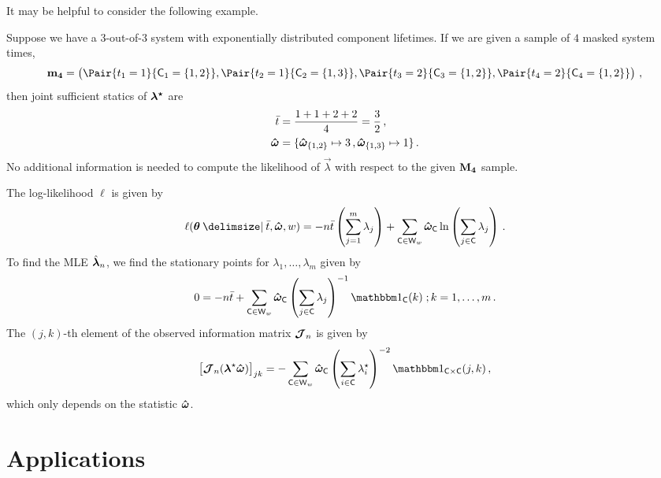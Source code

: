 \documentclass[
    11pt,
    extrafontsizes,
    article,
    oldfontcommands,
    final,
    oneside,
    openany,
    hidelinks]{memoir}
\begin{document}
It may be helpful to consider the following example.
\begin{example}
Suppose we have a $3$-out-of-$3$ system with exponentially distributed component lifetimes.
If we are given a sample of $4$ masked system times,
\begin{equation}
    \mfsoi{4} = \left(
        \Pair{t_1 = 1}{\cand_1 = \{ 1, 2 \}},
        \Pair{t_2 = 1}{\cand_2 = \{ 1, 3 \}},
        \Pair{t_3 = 2}{\cand_3 = \{ 1, 2 \}},
        \Pair{t_4 = 2}{\cand_4 = \{ 1, 2 \}}
    \right)\,,
\end{equation}
then joint sufficient statics of $\boldsymbol{\mathbf{{\lambda}^{\star}}}$ are
\begin{align*}
    \bar t &= \frac{1 + 1 + 2 + 2}{4} = \frac{3}{2}\,,\\
    \boldsymbol{\hat\omega} &= \{\boldsymbol{\hat\omega}_{\{1,2\}} \mapsto 3\,,\boldsymbol{\hat\omega}_{\{1,3\}} \mapsto 1\}\,.
\end{align*}
No additional information is needed to compute the likelihood of $\vec\lambda$ with respect to the given $\boldsymbol{\mathbf{M_{4}}}$ sample.
\end{example}

The log-likelihood $\ell$ is given by
\begin{equation}
\ell(\sysparamvec \Given \bar t, \vec\cntsymb, w) =
    -n \bar t \left ( \sum_{j=1}^{m} \lambda_j \right ) +
    \sum_{\cand \in \candsw{w}} \cntsymb_{\cand} \ln
        \left ( \sum_{j \in \cand} \lambda_j \right )\,.
\end{equation}
To find the MLE $\hat{\boldsymbol{\mathbf{\lambda}}}_n$, we find the stationary points for $\lambda_1, \ldots, \lambda_m$ given by
\begin{equation}
    0   =  -n \bar t +
            \sum_{\cand \in \candsw{w}} \cntsymb_{\cand}
                \left (
                    \sum_{j \in \cand} \lambda_j
                \right )^{-1} \SetIndicator{\cand}(k)\;; k = 1, \ldots, m\,.
\end{equation}
The $(j, k)$-th element of the observed information matrix $\operatorname{\boldsymbol{\mathcal{J}}}_n$ is given by
\begin{equation}
    \left [ \observed_n(\tparam{\vec\lambda} \vec\cntsymb) \right ]_{j k} =
        - \sum_{\cand \in \candsw{w}} \cntsymb_{\cand} \left( \sum_{i \in \cand} \tparam\lambda_i \right)^{-2} \SetIndicator{\cand \times \cand}(j,k)\,,
\end{equation}
which only depends on the statistic $\boldsymbol{\hat\omega}$.

\section{Applications}
\end{document}

